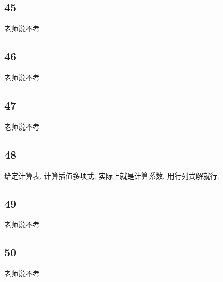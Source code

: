 \documentclass[a4paper, draft]{article}
\begin{document}
\subsection*{45}

老师说不考

\subsection*{46}

老师说不考

\subsection*{47}

老师说不考

\subsection*{48}

给定计算表, 计算插值多项式, 实际上就是计算系数, 用行列式解就行.

\subsection*{49}

老师说不考

\subsection*{50}

老师说不考
\end{document}
